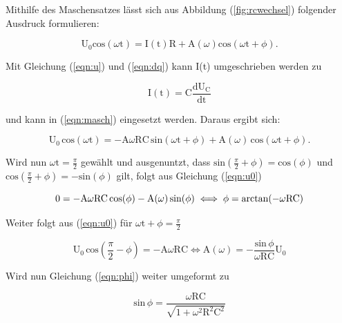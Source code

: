 \noindent
Mithilfe des Maschensatzes lässt sich aus Abbildung (\ref{fig:rcwechsel}) folgender Ausdruck formulieren:

\begin{equation}
\text{U}_0 \text{cos}(\omega \text{t}) = \text{I}(\text{t})\text{R} + \text{A} (\omega) \text{cos}(\omega\text{t} + \phi).
\label{eqn:masch}
\end{equation}

\noindent
Mit Gleichung (\ref{eqn:u}) und (\ref{eqn:dq}) kann I(t) umgeschrieben werden zu

\begin{equation}
\text{I}(\text{t}) = \text{C} \frac{\text{dU}_\text{C}}{\text{dt}}
\label{eqn:it}
\end{equation}

\noindent 
und kann in (\ref{eqn:masch}) eingesetzt werden.
Daraus ergibt sich:

\begin{equation}
\text{U}_0 \, \text{cos}(\omega \text{t}) = -\text{A}\omega\text{RC} \, \text{sin} (\omega\text{t} + \phi ) + \text{A} (\omega) \, \text{cos}(\omega\text{t} + \phi).
\label{eqn:u0}
\end{equation}

\noindent
Wird nun $\omega \text{t} = \frac{\pi}{2}$ gewählt und ausgenuntzt, dass $\text{sin}(\frac{\pi}{2} + \phi) = \text{cos}(\phi)$ und $\text{cos}(\frac{\pi}{2} + \phi) = -\text{sin}(\phi)$ gilt, folgt aus Gleichung (\ref{eqn:u0})

\begin{equation}
0 = -\text{A}\omega\text{RC}\, \text{cos}(\phi) - \text{A} (\omega) \, \text{sin}(\phi) \\
\iff \phi = \text{arctan}(-\omega\text{RC})
\label{eqn:phi}
\end{equation}

\noindent
Weiter folgt aus (\ref{eqn:u0}) für $\omega\text{t} + \phi = \frac{\pi}{2}$

\begin{equation}
\text{U}_0 \, \text{cos}(\frac{\pi}{2} - \phi) = -\text{A}\omega\text{RC}
\iff \text{A}(\omega) = - \frac{\text{sin} \, \phi}{\omega\text{RC}} \text{U}_0
\label{eqn:a}
\end{equation}

\noindent
Wird nun Gleichung (\ref{eqn:phi}) weiter umgeformt zu 

\begin{equation}
\text{sin} \, \phi = \frac{\omega \text{RC}}{\sqrt{1 + \omega^2 \text{R}^2 \text{C}^2 }}
\end{equation}


